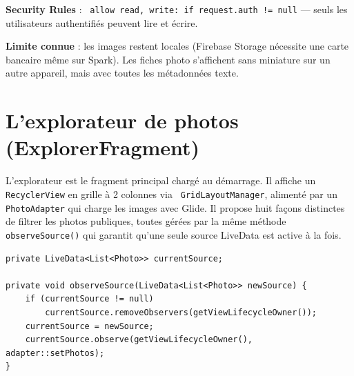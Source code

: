 \documentclass[a4paper,12pt,openany]{report}
\newcommand{\ic}[1]{\texttt{\small\colorbox{lightbg}{\color{navy!90} #1}}}
\begin{document}
\textbf{Security Rules} : \ic{allow read, write: if request.auth != null} —
seuls les utilisateurs authentifiés peuvent lire et écrire.

\textbf{Limite connue} : les images restent locales (Firebase Storage nécessite
une carte bancaire même sur Spark). Les fiches photo s'affichent sans miniature
sur un autre appareil, mais avec toutes les métadonnées texte.

\section{L'explorateur de photos (ExplorerFragment)}

L'explorateur est le fragment principal chargé au démarrage. Il affiche un
\ic{RecyclerView} en grille à 2 colonnes via \ic{GridLayoutManager}, alimenté
par un \ic{PhotoAdapter} qui charge les images avec Glide. Il propose huit
façons distinctes de filtrer les photos publiques, toutes gérées par la même
méthode \ic{observeSource()} qui garantit qu'une seule source LiveData est
active à la fois.

\begin{lstlisting}
private LiveData<List<Photo>> currentSource;

private void observeSource(LiveData<List<Photo>> newSource) {
    if (currentSource != null)
        currentSource.removeObservers(getViewLifecycleOwner());
    currentSource = newSource;
    currentSource.observe(getViewLifecycleOwner(), adapter::setPhotos);
}
\end{lstlisting}
\end{document}
